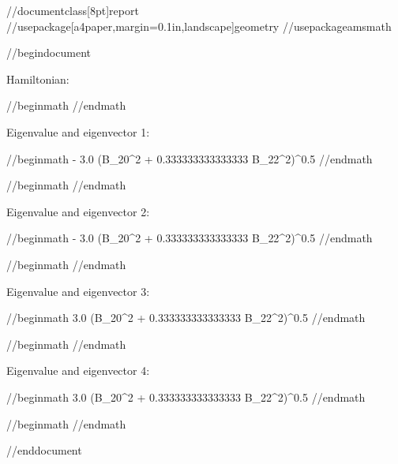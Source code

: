 //documentclass[8pt]{report}
//usepackage[a4paper,margin=0.1in,landscape]{geometry}
//usepackage{amsmath}

//begin{document}

Hamiltonian:

//begin{math}
//end{math}

Eigenvalue and eigenvector 1:

//begin{math}
- 3.0 \left(B_{20}^{2} + 0.333333333333333 B_{22}^{2}\right)^{0.5}
//end{math}

//begin{math}
//end{math}

Eigenvalue and eigenvector 2:

//begin{math}
- 3.0 \left(B_{20}^{2} + 0.333333333333333 B_{22}^{2}\right)^{0.5}
//end{math}

//begin{math}
//end{math}

Eigenvalue and eigenvector 3:

//begin{math}
3.0 \left(B_{20}^{2} + 0.333333333333333 B_{22}^{2}\right)^{0.5}
//end{math}

//begin{math}
//end{math}

Eigenvalue and eigenvector 4:

//begin{math}
3.0 \left(B_{20}^{2} + 0.333333333333333 B_{22}^{2}\right)^{0.5}
//end{math}

//begin{math}
//end{math}


//end{document}
